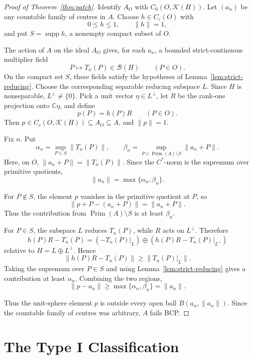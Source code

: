 \documentclass[11pt]{article}
\newcommand{\Kcal}{\mathcal K}
\newcommand{\Bcal}{\mathcal B}
\newcommand{\C}{\mathbb C}
\newcommand{\Prim}{\operatorname{Prim}}
\newcommand{\supp}{\operatorname{supp}}
\begin{document}
\begin{proof}[Proof of Theorem~\ref{thm:patch}]
Identify \(A_O\) with \(C_0(O,\Kcal(H))\).  Let \((a_n)\) be any countable
family of centres in \(A\).  Choose \(h\in C_c(O)\) with
\[
        0\le h\le1,\qquad \|h\|=1,
\]
and put \(S=\supp h\), a nonempty compact subset of \(O\).

The action of \(A\) on the ideal \(A_O\) gives, for each \(a_n\), a bounded
strict-continuous multiplier field
\[
        P\longmapsto T_n(P)\in\Bcal(H)
        \qquad(P\in O).
\]
On the compact set \(S\), these fields satisfy the hypotheses of
Lemma~\ref{lem:strict-reducing}.  Choose the corresponding separable reducing
subspace \(L\).  Since \(H\) is nonseparable, \(L^\perp\ne\{0\}\).  Pick a
unit vector \(\eta\in L^\perp\), let \(R\) be the rank-one projection onto
\(\C\eta\), and define
\[
        p(P)=h(P)R
        \qquad(P\in O).
\]
Then \(p\in C_c(O,\Kcal(H))\subseteq A_O\subseteq A\), and \(\|p\|=1\).

Fix \(n\).  Put
\[
        \alpha_n=\sup_{P\in S}\|T_n(P)\|,
        \qquad
        \beta_n=\sup_{P\in\Prim(A)\setminus S}\|a_n+P\|.
\]
Here, on \(O\), \(\|a_n+P\|=\|T_n(P)\|\).  Since the \(C^*\)-norm is the
supremum over primitive quotients,
\[
        \|a_n\|=\max\{\alpha_n,\beta_n\}.
\]

For \(P\notin S\), the element \(p\) vanishes in the primitive quotient at
\(P\), so
\[
        \|p+P-(a_n+P)\|=\|a_n+P\|.
\]
Thus the contribution from \(\Prim(A)\setminus S\) is at least \(\beta_n\).

For \(P\in S\), the subspace \(L\) reduces \(T_n(P)\), while \(R\) acts on
\(L^\perp\).  Therefore
\[
        h(P)R-T_n(P)
        =
        (-T_n(P)|_L)\oplus
        (h(P)R-T_n(P)|_{L^\perp})
\]
relative to \(H=L\oplus L^\perp\).  Hence
\[
        \|h(P)R-T_n(P)\|\ge\|T_n(P)|_L\|.
\]
Taking the supremum over \(P\in S\) and using
Lemma~\ref{lem:strict-reducing} gives a contribution at least \(\alpha_n\).
Combining the two regions,
\[
        \|p-a_n\|\ge\max\{\alpha_n,\beta_n\}=\|a_n\|.
\]

Thus the unit-sphere element \(p\) is outside every open ball
\(B(a_n,\|a_n\|)\).  Since the countable family of centres was arbitrary,
\(A\) fails BCP.
\end{proof}

\section*{The Type I Classification}
\end{document}
